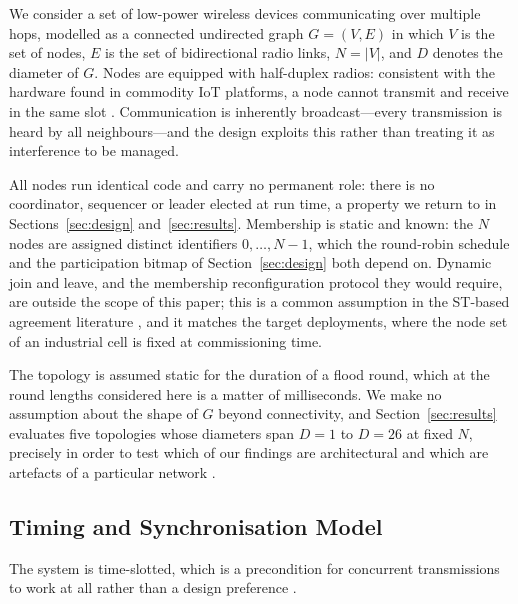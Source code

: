 \documentclass[journal]{IEEEtran}
\newcommand{\Nnodes}{N}                   %
\newcommand{\Diam}{D}                     %
\begin{document}
We consider a set of low-power wireless devices communicating over
multiple hops, modelled as a connected undirected graph $G = (V, E)$ in
which $V$ is the set of nodes, $E$ is the set of bidirectional radio
links, $\Nnodes = |V|$, and $\Diam$ denotes the diameter of $G$. Nodes
are equipped with half-duplex radios: consistent with the hardware found
in commodity IoT platforms, a node cannot transmit and receive in the same
slot \cite{zimmerling20survey}. Communication is inherently
broadcast---every transmission is heard by all neighbours---and the design
exploits this rather than treating it as interference to be managed.

All nodes run identical code and carry no permanent role: there is no
coordinator, sequencer or leader elected at run time, a property we return
to in Sections~\ref{sec:design} and~\ref{sec:results}. Membership is
static and known: the $\Nnodes$ nodes are assigned distinct identifiers
$0, \dots, \Nnodes-1$, which the round-robin schedule and the
participation bitmap of Section~\ref{sec:design} both depend on. Dynamic
join and leave, and the membership reconfiguration protocol they would
require, are outside the scope of this paper; this is a common assumption
in the ST-based agreement literature \cite{alnahas17a2},
\cite{poirot19paxos} and it matches the target deployments, where the node
set of an industrial cell is fixed at commissioning time.

The topology is assumed static for the duration of a flood round, which at
the round lengths considered here is a matter of milliseconds. We make no
assumption about the shape of $G$ beyond connectivity, and
Section~\ref{sec:results} evaluates five topologies whose diameters span
$\Diam = 1$ to $\Diam = 26$ at fixed $\Nnodes$, precisely in order to test
which of our findings are architectural and which are artefacts of a
particular network \cite{alnahas19blueflood}.

\subsection{Timing and Synchronisation Model}
\label{sec:model-timing}

The system is time-slotted, which is a precondition for concurrent
transmissions to work at all rather than a design preference
\cite{zimmerling20survey}.
\end{document}
